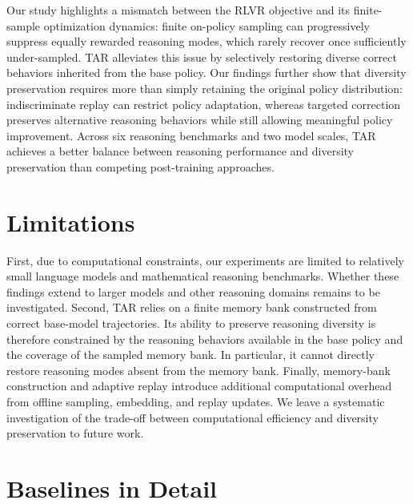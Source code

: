 \documentclass[11pt]{article}
\newcommand{\model}{\textsc{TAR}\xspace}
\begin{document}
Our study highlights a mismatch between the RLVR objective and its finite-sample optimization dynamics: finite on-policy sampling can progressively suppress equally rewarded reasoning modes, which rarely recover once sufficiently under-sampled. \model alleviates this issue by selectively restoring diverse correct behaviors inherited from the base policy. Our findings further show that diversity preservation requires more than simply retaining the original policy distribution: indiscriminate replay can restrict policy adaptation, whereas targeted correction preserves alternative reasoning behaviors while still allowing meaningful policy improvement. Across six reasoning benchmarks and two model scales, \model achieves a better balance between reasoning performance and diversity preservation than competing post-training approaches.


\section*{Limitations}

First, due to computational constraints, our experiments are limited to relatively small language models and mathematical reasoning benchmarks. Whether these findings extend to larger models and other reasoning domains remains to be investigated. Second, \model relies on a finite memory bank constructed from correct base-model trajectories. Its ability to preserve reasoning diversity is therefore constrained by the reasoning behaviors available in the base policy and the coverage of the sampled memory bank. In particular, it cannot directly restore reasoning modes absent from the memory bank. Finally, memory-bank construction and adaptive replay introduce additional computational overhead from offline sampling, embedding, and replay updates. We leave a systematic investigation of the trade-off between computational efficiency and diversity preservation to future work.



\appendix

\section{Baselines in Detail}
\label{app:baselines}
\end{document}
